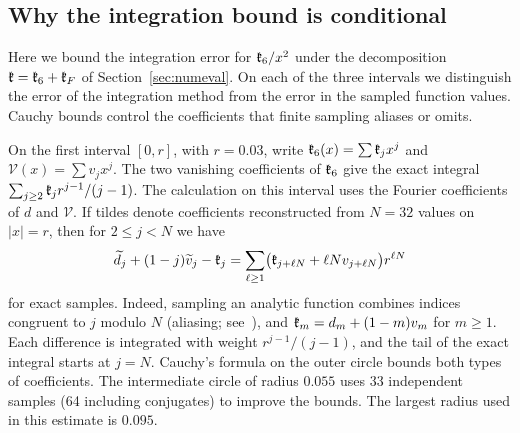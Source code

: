 \subsection{Why the integration bound is conditional}
Here we bound the integration error for $\mathfrak{k}_6/x^2$ under the decomposition
$\mathfrak{k}=\mathfrak{k}_6+\mathfrak{k}_F$ of Section~\ref{sec:numeval}. On each of the three intervals we
distinguish the error of the integration method from the error in the sampled function values.
Cauchy bounds control the coefficients that finite sampling aliases or omits.

On the first interval $[0,r]$, with $r=0.03$, write $\mathfrak{k}_6(x)=\sum \mathfrak{k}_jx^j$ and $\mathcal
V(x)=\sum v_jx^j$. The two vanishing coefficients of $\mathfrak{k}_6$ give the exact integral
$\sum_{j\ge2}\mathfrak{k}_jr^{j-1}/(j-1)$. The calculation on this interval uses the Fourier
coefficients of $d$ and $\mathcal V$. If tildes denote coefficients reconstructed from $N=32$
values on $|x|=r$, then for $2\le j<N$ we have
\[
 \widetilde d_j+(1-j)\widetilde v_j-\mathfrak{k}_j
   =\sum_{\ell\ge1}\bigl(\mathfrak{k}_{j+\ell N}+\ell N v_{j+\ell N}\bigr)r^{\ell N}
\]
for exact samples. Indeed, sampling an analytic function combines indices congruent to $j$ modulo
$N$ (aliasing; see~\cite{tw}), and $\mathfrak{k}_m=d_m+(1-m)v_m$ for $m\ge1$. Each difference is integrated
with weight
$r^{j-1}/(j-1)$, and the tail of the exact integral starts at $j=N$. Cauchy's formula on the outer
circle bounds both types of coefficients. The intermediate circle of radius $0.055$ uses 33
independent samples (64 including conjugates) to improve the bounds. The largest radius used in
this estimate is $0.095$.


